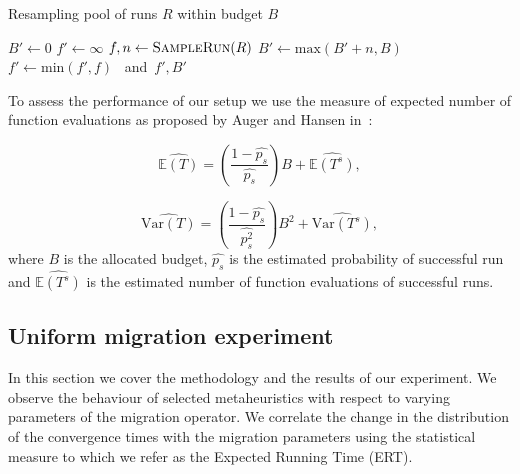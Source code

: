 \documentclass{sig-alternate}
\begin{document}
\begin{algorithm}
\caption{Resampling pool of runs $R$ within budget $B$}
\label{alg:resample}
\begin{algorithmic}[1]
    \State $B' \gets 0$
    \State $f' \gets \infty$
    \Do
        \State $f, n \gets \Call{SampleRun}{R}$%
        \State $B' \gets \mbox{max}(B' + n, B)$
        \State $f' \gets \mbox{min}(f', f)$
    \EndFunction \mbox{ and }\Return $f', B'$
\end{algorithmic}
\end{algorithm}

To assess the performance of our setup we use the measure of expected number of function evaluations as proposed by Auger and Hansen in~\cite{Hansen05performanceevaluation}:

\begin{equation}
    \widehat{\mathbb{E}(T)} = \left(\dfrac{1 - \widehat{p_s}}{\widehat{p_s}}\right) B + \widehat{\mathbb{E}(T^s)},
    \label{eq:ert}
\end{equation}

\begin{equation}
    \widehat{\mbox{Var}(T)} = \left(\dfrac{1 - \widehat{p_s}}{\widehat{p_s^2}}\right) B^2 + \widehat{\mbox{Var}(T^s)},
    \label{eq:var}
\end{equation}
where $B$ is the allocated budget, $\widehat{p_s}$ is the estimated probability of successful run and $\widehat{\mathbb{E}(T^s)}$ is the estimated number of function evaluations of successful runs.


\subsection{Uniform migration experiment}
In this section we cover the methodology and the results of our experiment.
We observe the behaviour of selected metaheuristics with respect to varying parameters of the migration operator.
We correlate the change in the distribution of the convergence times with the migration parameters using the statistical measure to which we refer as the Expected Running Time (ERT).
\end{document}
